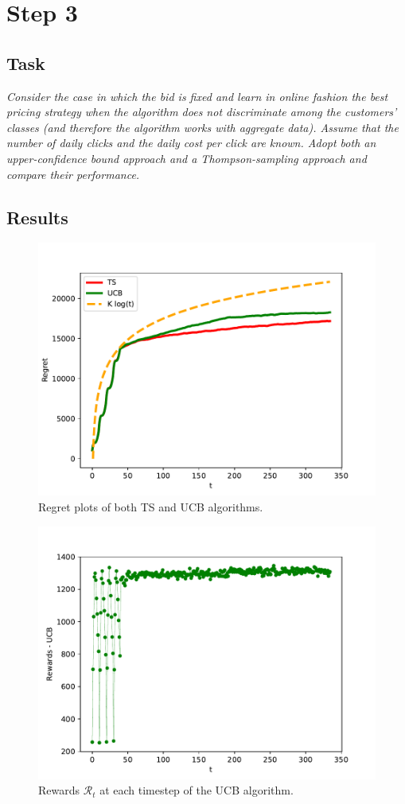 \documentclass[12pt,a4paper]{report}
\begin{document}
		\section{Step 3}
			\subsection{Task}
\textit{Consider the case in which the bid is fixed and learn in online fashion the best pricing strategy when the algorithm does not discriminate among the customers’ classes (and therefore the algorithm works with aggregate data). Assume that the number of daily clicks and the daily cost per click are known. Adopt both an upper-confidence bound approach and a Thompson-sampling approach and compare their performance.}
			\subsection{Results}
\begin{figure}[H]
\centering
  \includegraphics[scale = 0.7, center]{3r}
  \caption{Regret plots of both TS and UCB algorithms.}
\end{figure}
\begin{figure}[H]
\centering
  \includegraphics[scale = 0.7, center]{3rewu}
  \caption{Rewards $\mathcal R_t$ at each timestep of the UCB algorithm.}
\end{figure}
\end{document}
